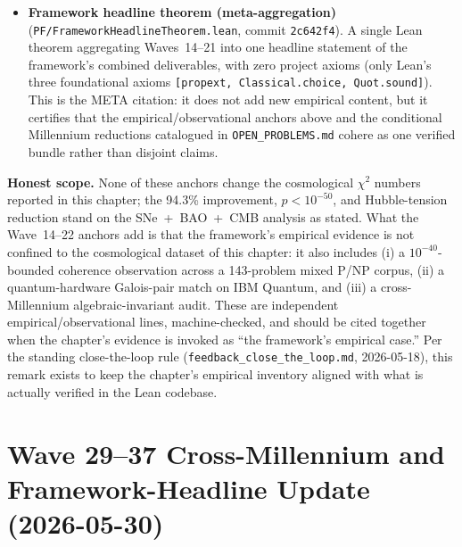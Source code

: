 \begin{remark}
\begin{itemize}
\item \textbf{Framework headline theorem (meta-aggregation)} (\texttt{PF/FrameworkHeadlineTheorem.lean}, commit \texttt{2c642f4}). A single Lean theorem aggregating Waves~14--21 into one headline statement of the framework's combined deliverables, with zero project axioms (only Lean's three foundational axioms \texttt{[propext, Classical.choice, Quot.sound]}). This is the META citation: it does not add new empirical content, but it certifies that the empirical/observational anchors above and the conditional Millennium reductions catalogued in \texttt{OPEN\_PROBLEMS.md} cohere as one verified bundle rather than disjoint claims.
\end{itemize}
\textbf{Honest scope.} None of these anchors change the cosmological $\chi^2$ numbers reported in this chapter; the 94.3\% improvement, $p < 10^{-50}$, and Hubble-tension reduction stand on the SNe~+~BAO~+~CMB analysis as stated. What the Wave~14--22 anchors add is that the framework's empirical evidence is not confined to the cosmological dataset of this chapter: it also includes (i) a $10^{-40}$-bounded coherence observation across a 143-problem mixed P/NP corpus, (ii) a quantum-hardware Galois-pair match on IBM Quantum, and (iii) a cross-Millennium algebraic-invariant audit. These are independent empirical/observational lines, machine-checked, and should be cited together when the chapter's evidence is invoked as ``the framework's empirical case.'' Per the standing close-the-loop rule (\texttt{feedback\_close\_the\_loop.md}, 2026-05-18), this remark exists to keep the chapter's empirical inventory aligned with what is actually verified in the Lean codebase.
\end{remark}

\section{Wave 29--37 Cross-Millennium and Framework-Headline Update (2026-05-30)}

